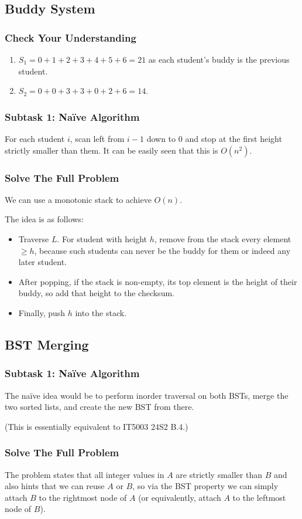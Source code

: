 \documentclass[12pt]{article}
\begin{document}
\subsection{Buddy System}
\subsubsection{Check Your Understanding}
\begin{enumerate}
\item $S_1=0+1+2+3+4+5+6=21$ as each student’s buddy is the previous student.
\item $S_2=0+0+3+3+0+2+6=14$.
\end{enumerate}
\subsubsection{Subtask 1: Naïve Algorithm}
For each student $i$, scan left from $i-1$ down to $0$ and stop at the first height strictly smaller than them. It can be easily seen that this is $O\left(n^2\right)$.
\subsubsection{Solve The Full Problem}
We can use a monotonic stack to achieve $O(n)$.

The idea is as follows:
\begin{itemize}
\item Traverse $L$. For student with height $h$, remove from the stack every element $\ge h$, because such students can never be the buddy for them or indeed any later student.
\item After popping, if the stack is non-empty, its top element is the height of their buddy, so add that height to the checksum.
\item Finally, push $h$ into the stack.
\end{itemize}
\subsection{BST Merging}
\subsubsection{Subtask 1: Naïve Algorithm}
The naïve idea would be to perform inorder traversal on both BSTs, merge the two sorted lists, and create the new BST from there.

(This is essentially equivalent to IT5003 24S2 B.4.)
\subsubsection{Solve The Full Problem}
The problem states that all integer values in $A$ are strictly smaller than $B$ and also hints that we can reuse $A$ or $B$, so via the BST property we can simply attach $B$ to the rightmost node of $A$ (or equivalently, attach $A$ to the leftmost node of $B$).
\end{document}
